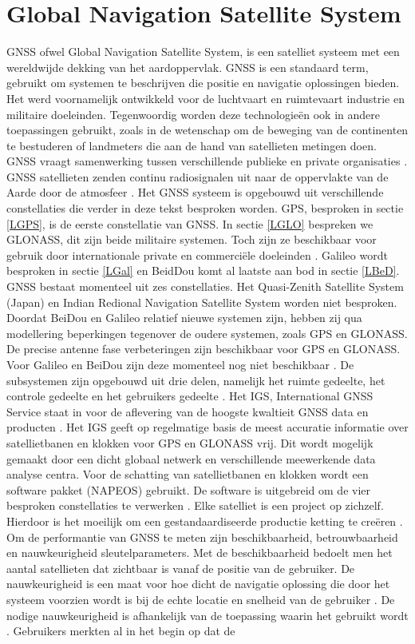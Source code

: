 \section{Global Navigation Satellite System}
\label{LGNS}
GNSS ofwel Global Navigation Satellite System, is een satelliet systeem met een wereldwijde dekking van het aardoppervlak. GNSS is een standaard term, gebruikt om systemen te beschrijven die positie en navigatie oplossingen bieden. Het werd voornamelijk ontwikkeld voor de luchtvaart en ruimtevaart industrie en militaire doeleinden. Tegenwoordig worden deze technologie\"en ook in andere toepassingen gebruikt, zoals in de wetenschap om de beweging van de continenten te bestuderen of landmeters die aan de hand van satellieten metingen doen. GNSS vraagt samenwerking tussen verschillende publieke en private organisaties \cite{LBibGNSS3}. GNSS satellieten zenden continu radiosignalen uit naar de oppervlakte van de Aarde door de atmosfeer \cite{LBibGPS4}. Het GNSS systeem is opgebouwd uit verschillende constellaties die verder in deze tekst besproken worden. GPS, besproken in sectie \ref{LGPS}, is de eerste constellatie van GNSS. In sectie \ref{LGLO} bespreken we GLONASS, dit zijn beide militaire systemen. Toch zijn ze beschikbaar voor gebruik door internationale private en commerci\"ele doeleinden \cite{LBibGNSS8}. Galileo wordt besproken in sectie \ref{LGal} en BeidDou komt al laatste aan bod in sectie \ref{LBeD}. GNSS bestaat momenteel uit zes constellaties. Het Quasi-Zenith Satellite System (Japan) en Indian Redional Navigation Satellite System worden niet besproken. Doordat BeiDou en Galileo relatief nieuwe systemen zijn, hebben zij qua modellering beperkingen tegenover de oudere systemen, zoals GPS en GLONASS. De precise antenne fase verbeteringen zijn beschikbaar voor GPS en GLONASS. Voor Galileo en BeiDou zijn deze momenteel nog niet beschikbaar \cite{LBibPPP2}. De subsystemen zijn opgebouwd uit drie delen, namelijk het ruimte gedeelte, het controle gedeelte en het gebruikers gedeelte \cite{LBibBeiDou2}.  Het IGS, International GNSS Service staat in voor de aflevering van de hoogste kwaltieit GNSS data en producten \cite{LBibGNSS}. Het IGS geeft op regelmatige basis de meest accuratie informatie over satellietbanen en klokken voor GPS en GLONASS vrij. Dit wordt mogelijk gemaakt door een dicht globaal netwerk en verschillende meewerkende data analyse centra. Voor de schatting van satellietbanen en klokken wordt een software pakket (NAPEOS) gebruikt. De software is uitgebreid om de vier besproken constellaties te verwerken \cite{LBibPPP2}. Elke satelliet is een project op zichzelf. Hierdoor is het moeilijk om een gestandaardiseerde productie ketting te cre\"eren \cite{LBibGNSS3}. Om de performantie van GNSS te meten zijn beschikbaarheid, betrouwbaarheid en nauwkeurigheid sleutelparameters. Met de beschikbaarheid bedoelt men het aantal satellieten dat zichtbaar is vanaf de positie van de gebruiker. De nauwkeurigheid is een maat voor hoe dicht de navigatie oplossing die door het systeem voorzien wordt is bij de echte locatie en snelheid van de gebruiker \cite{LBibGNSS6}. De nodige nauwkeurigheid is afhankelijk van de toepassing waarin het gebruikt wordt \cite{LBibRTK3}. Gebruikers merkten al in het begin op dat de 